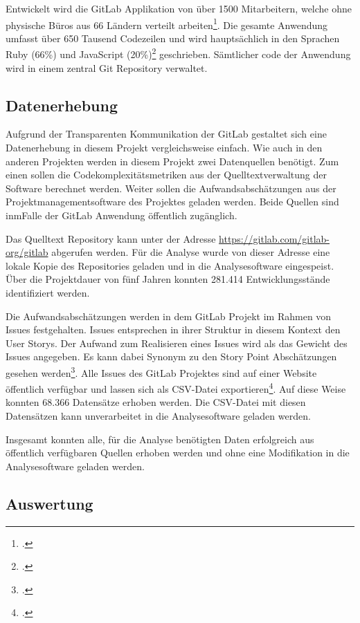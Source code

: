Entwickelt wird die GitLab Applikation von über 1500 Mitarbeitern,
welche ohne physische Büros aus 66 Ländern verteilt arbeiten\footcite[Vgl. ][]{GitLabGitLab}.
Die gesamte Anwendung umfasst über 650 Tausend Codezeilen und wird hauptsächlich in den Sprachen Ruby (66\%) und
JavaScript (20\%)\footcite[Vgl. ][]{GitLabOrgGitLab} geschrieben. Sämtlicher code
der Anwendung wird in einem zentral Git Repository verwaltet.

\subsection{Datenerhebung}\label{gitlab-Datenerhebung}

Aufgrund der Transparenten Kommunikation der GitLab gestaltet sich eine
Datenerhebung in diesem Projekt vergleichsweise einfach. Wie auch in den
anderen Projekten werden in diesem Projekt zwei Datenquellen benötigt.
Zum einen sollen die Codekomplexitätsmetriken aus der
Quelltextverwaltung der Software berechnet werden. Weiter sollen die
Aufwandsabschätzungen aus der Projektmanagementsoftware des Projektes
geladen werden. Beide Quellen sind inmFalle der GitLab Anwendung
öffentlich zugänglich.

Das Quelltext Repository kann unter der Adresse
\url{https://gitlab.com/gitlab-org/gitlab} abgerufen werden. Für die
Analyse wurde von dieser Adresse eine lokale Kopie des Repositories
geladen und in die Analysesoftware eingespeist. Über die Projektdauer
von fünf Jahren konnten 281.414 Entwicklungsstände identifiziert werden.

Die Aufwandsabschätzungen werden in dem GitLab Projekt im Rahmen von
Issues festgehalten. Issues entsprechen in ihrer Struktur in diesem
Kontext den User Storys. Der Aufwand zum Realisieren eines Issues wird
als das Gewicht des Issues angegeben. Es kann dabei Synonym zu den Story
Point Abschätzungen gesehen werden\footcite[Vgl. ][]{ScaledAgileGitLab}. Alle
Issues des GitLab Projektes sind auf einer Website öffentlich verfügbar
und lassen sich als CSV-Datei exportieren\footcite[Vgl. ][]{IssuesGitLabOrg}. Auf
diese Weise konnten 68.366 Datensätze erhoben werden. Die CSV-Datei mit
diesen Datensätzen kann unverarbeitet in die Analysesoftware geladen
werden.

Insgesamt konnten alle, für die Analyse benötigten Daten erfolgreich aus
öffentlich verfügbaren Quellen erhoben werden und ohne eine Modifikation
in die Analysesoftware geladen werden.

\subsection{Auswertung}\label{gitlab-Auswertung}

